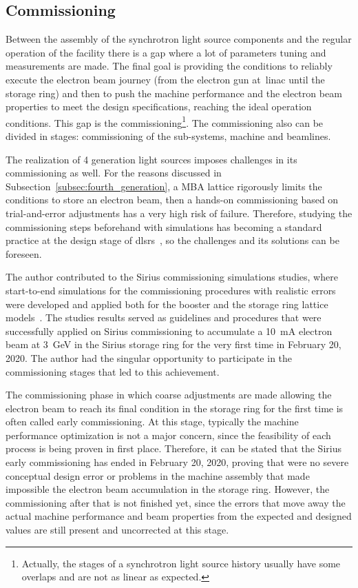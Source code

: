 \subsection{Commissioning}
Between the assembly of the synchrotron light source components and the regular operation of the facility there is a gap where a lot of parameters tuning and measurements are made. The final goal is providing the conditions to reliably execute the electron beam journey (from the electron gun at~\gls{linac} until the storage ring) and then to push the machine performance and the electron beam properties to meet the design specifications, reaching the ideal operation conditions. This gap is the commissioning\footnote{Actually, the stages of a synchrotron light source history usually have some overlaps and are not as linear as expected.}. The commissioning also can be divided in stages: commissioning of the sub-systems, machine and beamlines.

The realization of 4 generation light sources imposes challenges in its commissioning as well. For the reasons discussed in Subsection~\ref{subsec:fourth_generation}, a MBA lattice rigorously limits the conditions to store an electron beam, then a hands-on commissioning based on trial-and-error adjustments has a very high risk of failure. Therefore, studying the commissioning steps beforehand with simulations has becoming a standard practice at the design stage of \glspl{dlsr}~\cite{sajaev2015, liuzzo2017, ghasem2019, sajaev2019, hellert2019}, so the challenges and its solutions can be foreseen. 

The author contributed to the Sirius commissioning simulations studies, where start-to-end simulations for the commissioning procedures with realistic errors were developed and applied both for the booster and the storage ring lattice models~\cite{alves2019}. The studies results served as guidelines and procedures that were successfully applied on Sirius commissioning to accumulate a \SI{10}{\milli\ampere} electron beam at \SI{3}{\giga\electronvolt} in the Sirius storage ring for the very first time in February 20, 2020. The author had the singular opportunity to participate in the commissioning stages that led to this achievement.

The commissioning phase in which coarse adjustments are made allowing the electron beam to reach its final condition in the storage ring for the first time is often called early commissioning. At this stage, typically the machine performance optimization is not a major concern, since the feasibility of each process is being proven in first place. Therefore, it can be stated that the Sirius early commissioning has ended in February 20, 2020, proving that were no severe conceptual design error or problems in the machine assembly that made impossible the electron beam accumulation in the storage ring. However, the commissioning after that is not finished yet, since the errors that move away the actual machine performance and beam properties from the expected and designed values are still present and uncorrected at this stage.

